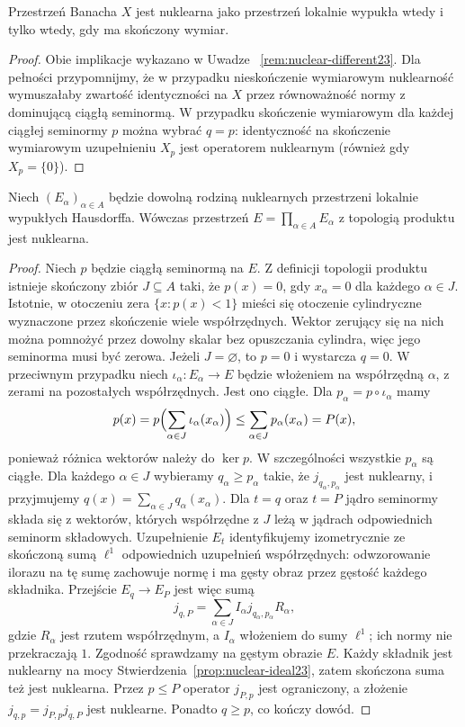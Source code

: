 \begin{wniosek}
\label{cor:banach-finite-nuclear24}
Przestrzeń Banacha $X$ jest nuklearna jako przestrzeń
lokalnie wypukła wtedy i tylko wtedy, gdy ma skończony wymiar.
\end{wniosek}
\begin{proof}
Obie implikacje wykazano w Uwadze~
\ref{rem:nuclear-different23}. Dla pełności przypomnijmy,
że w przypadku nieskończenie wymiarowym nuklearność
wymuszałaby zwartość identyczności na $X$ przez
równoważność normy z dominującą ciągłą seminormą.
W przypadku skończenie wymiarowym dla każdej ciągłej
seminormy $p$ można wybrać $q=p$: identyczność na
skończenie wymiarowym uzupełnieniu $X_p$ jest operatorem
nuklearnym (również gdy $X_p=\{0\}$).
\end{proof}


\begin{stwierdzenie}
\label{prop:nuclear-products24}
Niech $(E_\alpha)_{\alpha\in A}$ będzie dowolną rodziną
nuklearnych przestrzeni lokalnie wypukłych Hausdorffa.
Wówczas przestrzeń $E=\prod_{\alpha\in A}E_\alpha$
z topologią produktu jest nuklearna.
\end{stwierdzenie}
\begin{proof}
Niech $p$ będzie ciągłą seminormą na $E$.
Z definicji topologii produktu istnieje skończony zbiór
$J\subseteq A$ taki, że $p(x)=0$, gdy $x_\alpha=0$
dla każdego $\alpha\in J$. Istotnie, w otoczeniu zera
$\{x:p(x)<1\}$ mieści się otoczenie cylindryczne
wyznaczone przez skończenie wiele współrzędnych.
Wektor zerujący się na nich można pomnożyć przez dowolny
skalar bez opuszczania cylindra, więc jego seminorma
musi być zerowa. Jeżeli $J=\varnothing$, to $p=0$ i wystarcza $q=0$.
W przeciwnym przypadku niech $\iota_\alpha:E_\alpha\to E$
będzie włożeniem na współrzędną $\alpha$, z zerami
na pozostałych współrzędnych. Jest ono ciągłe.
Dla $p_\alpha=p\circ\iota_\alpha$ mamy
\[
 p(x)=p\Bigl(\sum_{\alpha\in J}\iota_\alpha(x_\alpha)\Bigr)
 \le\sum_{\alpha\in J}p_\alpha(x_\alpha)=P(x),
\]
ponieważ różnica wektorów należy do $\ker p$.
W szczególności wszystkie $p_\alpha$ są ciągłe.
Dla każdego $\alpha\in J$ wybieramy $q_\alpha\ge p_\alpha$
takie, że $j_{q_\alpha,p_\alpha}$ jest nuklearny,
i przyjmujemy $q(x)=\sum_{\alpha\in J}q_\alpha(x_\alpha)$.
Dla $t=q$ oraz $t=P$ jądro seminormy składa się
z wektorów, których współrzędne z $J$ leżą w jądrach
odpowiednich seminorm składowych. Uzupełnienie $E_t$
identyfikujemy izometrycznie ze skończoną sumą
$\ell^1$ odpowiednich uzupełnień współrzędnych:
odwzorowanie ilorazu na tę sumę zachowuje normę
i ma gęsty obraz przez gęstość każdego składnika.
Przejście $E_q\to E_P$ jest więc sumą
\[
 j_{q,P}=\sum_{\alpha\in J}
 I_\alpha j_{q_\alpha,p_\alpha}R_\alpha,
\]
gdzie $R_\alpha$ jest rzutem współrzędnym, a $I_\alpha$
włożeniem do sumy $\ell^1$; ich normy nie przekraczają $1$.
Zgodność sprawdzamy na gęstym obrazie $E$.
Każdy składnik jest nuklearny na mocy
Stwierdzenia~\ref{prop:nuclear-ideal23}, zatem
skończona suma też jest nuklearna. Przez $p\le P$
operator $j_{P,p}$ jest ograniczony, a złożenie
$j_{q,p}=j_{P,p}j_{q,P}$ jest nuklearne.
Ponadto $q\ge p$, co kończy dowód.
\end{proof}

